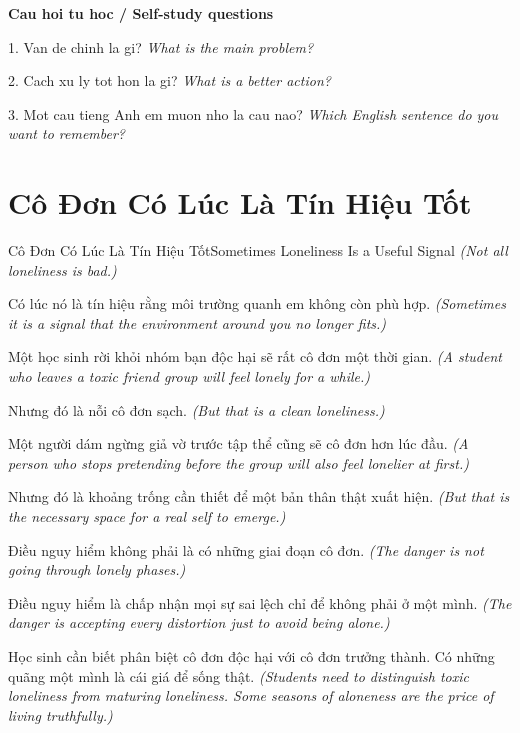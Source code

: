 \begin{tuhocnhanh}
\textbf{Cau hoi tu hoc / Self-study questions}

1. Van de chinh la gi? \textit{What is the main problem?}

2. Cach xu ly tot hon la gi? \textit{What is a better action?}

3. Mot cau tieng Anh em muon nho la cau nao? \textit{Which English sentence do you want to remember?}
\end{tuhocnhanh}
\ngancach

\section{Cô Đơn Có Lúc Là Tín Hiệu Tốt}
\begin{truyen}{Cô Đơn Có Lúc Là Tín Hiệu Tốt}{Sometimes Loneliness Is a Useful Signal}
\textit{(Not all loneliness is bad.)}

Có lúc nó là tín hiệu rằng môi trường quanh em không còn phù hợp.
\textit{(Sometimes it is a signal that the environment around you no longer fits.)}

Một học sinh rời khỏi nhóm bạn độc hại sẽ rất cô đơn một thời gian.
\textit{(A student who leaves a toxic friend group will feel lonely for a while.)}

Nhưng đó là nỗi cô đơn sạch.
\textit{(But that is a clean loneliness.)}

Một người dám ngừng giả vờ trước tập thể cũng sẽ cô đơn hơn lúc đầu.
\textit{(A person who stops pretending before the group will also feel lonelier at first.)}

Nhưng đó là khoảng trống cần thiết để một bản thân thật xuất hiện.
\textit{(But that is the necessary space for a real self to emerge.)}

Điều nguy hiểm không phải là có những giai đoạn cô đơn.
\textit{(The danger is not going through lonely phases.)}

Điều nguy hiểm là chấp nhận mọi sự sai lệch chỉ để không phải ở một mình.
\textit{(The danger is accepting every distortion just to avoid being alone.)}

\end{truyen}

\begin{baihoc}
Học sinh cần biết phân biệt cô đơn độc hại với cô đơn trưởng thành. Có những quãng một mình là cái giá để sống thật.
\textit{(Students need to distinguish toxic loneliness from maturing loneliness. Some seasons of aloneness are the price of living truthfully.)}
\end{baihoc}

